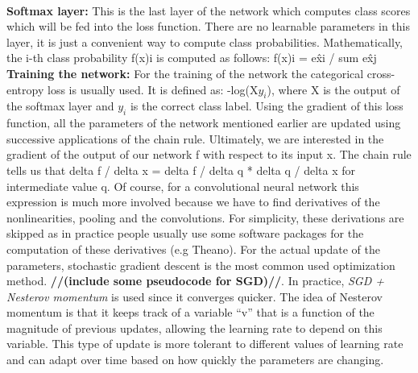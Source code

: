 \documentclass[a4paper]{article}
\begin{document}
\begin{justify}
\newline
\\
\textbf{Softmax layer:} This is the last layer of the network which computes class scores which will be fed into the loss function. There are no learnable parameters in this layer, it is just a convenient way to compute class probabilities. Mathematically, the i-th class probability f(x)i is computed as follows: f(x)i = e\^xi / sum e\^xj
\newline
\\
\textbf{Training the network:}
For the training of the network the categorical cross-entropy loss is usually used. It is defined as: -log(X$y_i$), where X is the output of the softmax layer and $y_i$ is the correct class label. Using the gradient of this loss function, all the parameters of the network mentioned earlier are updated using successive applications of the chain rule. Ultimately, we are interested in the gradient of the output of our network f with respect to its input x. The chain rule tells us that delta f / delta x = delta f / delta q * delta q / delta x  for intermediate value q. Of course, for a convolutional neural network this expression is much more involved because we have to find derivatives of the nonlinearities, pooling and the convolutions. For simplicity, these derivations are skipped as in practice people usually use some software packages for the computation of these derivatives (e.g Theano). For the actual update of the parameters, stochastic gradient descent is the most common used optimization method.
\newline \textbf{//(include some pseudocode for SGD)//}.\newline
In practice, \textit{SGD + Nesterov momentum} is used since it converges quicker. The idea of Nesterov momentum is that it keeps track of a variable ``v'' that is a function of the magnitude of previous updates, allowing the learning rate to depend on this variable. This type of update is more tolerant to different values of learning rate and can adapt over time based on how quickly the parameters are changing.

\end{justify}
\end{document}
